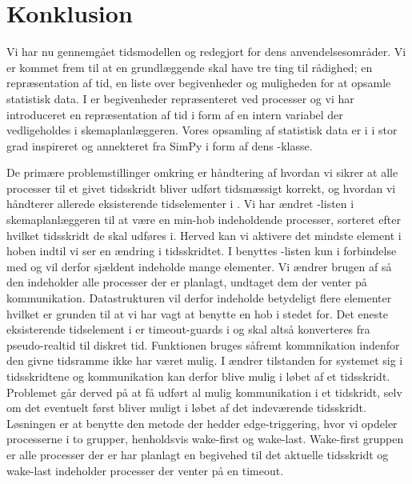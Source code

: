 \section{Konklusion}
Vi har nu gennemgået tidsmodellen \des og redegjort for dens anvendelsesområder. Vi er kommet frem til at en \des grundlæggende skal have tre ting til rådighed; en repræsentation af tid, en liste over begivenheder og muligheden for at opsamle statistisk data. I \pycsp er begivenheder repræsenteret ved processer og vi har introduceret en repræsentation af tid i form af en intern variabel der vedligeholdes i skemaplanlæggeren. Vores opsamling af statistisk data er i i stor grad inspireret og annekteret fra SimPy i form af dens -klasse. 

De primære problemstillinger omkring \des er håndtering af hvordan vi sikrer at alle processer til et givet tidsskridt bliver udført tidsmæssigt korrekt, og hvordan vi håndterer allerede eksisterende tidselementer i \pycsp. Vi har ændret -listen i skemaplanlæggeren til at være en min-hob indeholdende processer, sorteret efter hvilket tidsskridt de skal udføres i. Herved kan vi aktivere det mindste element i hoben indtil vi ser en ændring i tidsskridtet. I \pycsp benyttes -listen kun i forbindelse med  og vil derfor sjældent indeholde mange elementer. Vi ændrer brugen af  så den indeholder alle processer der er planlagt, undtaget dem der venter på kommunikation. Datastrukturen vil derfor indeholde betydeligt flere elementer hvilket er grunden til at vi har vagt at benytte en hob i stedet for. 
Det eneste eksisterende tidselement i \pycsp er timeout-guards i  og skal altså konverteres fra pseudo-realtid til diskret tid. Funktionen bruges såfremt kommnikation indenfor den givne tidsramme ikke har været mulig. I \des ændrer tilstanden for systemet sig i tidsskridtene og kommunikation kan derfor blive mulig i løbet af et tidsskridt. Problemet går derved på at få udført al mulig kommunikation i et tidskridt, selv om det eventuelt først bliver muligt i løbet af det indeværende tidsskridt. Løsningen er at benytte den metode der hedder edge-triggering, hvor vi opdeler processerne i to grupper, henholdsvis wake-first og wake-last. Wake-first gruppen er alle processer der er har planlagt en begivehed til det aktuelle tidsskridt og wake-last indeholder processer der venter på en timeout. 

